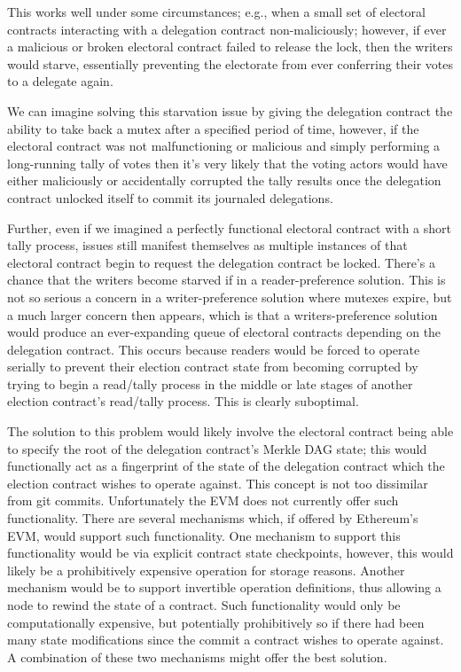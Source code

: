 This works well under some circumstances; e.g., when a small set of electoral
contracts interacting with a delegation contract non-maliciously; however, if
ever a malicious or broken electoral contract failed to release the lock, then
the writers would starve, essentially preventing the electorate from ever
conferring their votes to a delegate again.

We can imagine solving this starvation issue by giving the delegation contract
the ability to take back a mutex after a specified period of time, however, if
the electoral contract was not malfunctioning or malicious and simply performing
a long-running tally of votes then it's very likely that the voting actors would
have either maliciously or accidentally corrupted the tally results once the
delegation contract unlocked itself to commit its journaled delegations.

Further, even if we imagined a perfectly functional electoral contract with a
short tally process, issues still manifest themselves as multiple instances of
that electoral contract begin to request the delegation contract be locked.
There's a chance that the writers become starved if in a reader-preference
solution. This is not so serious a concern in a writer-preference solution where
mutexes expire, but a much larger concern then appears, which is that a
writers-preference solution would produce an ever-expanding queue of electoral
contracts depending on the delegation contract. This occurs because readers
would be forced to operate serially to prevent their election contract state
from becoming corrupted by trying to begin a read/tally process in the middle or
late stages of another election contract's read/tally process. This is clearly
suboptimal.

The solution to this problem would likely involve the electoral contract being
able to specify the root of the delegation contract's Merkle DAG state; this
would functionally act as a fingerprint of the state of the delegation contract
which the election contract wishes to operate against. This concept is not too
dissimilar from git commits. Unfortunately the EVM does not currently offer such
functionality.  There are several mechanisms which, if offered by Ethereum's
EVM, would support such functionality. One mechanism to support this
functionality would be via explicit contract state checkpoints, however, this
would likely be a prohibitively expensive operation for storage reasons. Another
mechanism would be to support invertible operation definitions, thus allowing a
node to rewind the state of a contract. Such functionality would only be
computationally expensive, but potentially prohibitively so if there had been
many state modifications since the commit a contract wishes to operate against.
A combination of these two mechanisms might offer the best solution.

